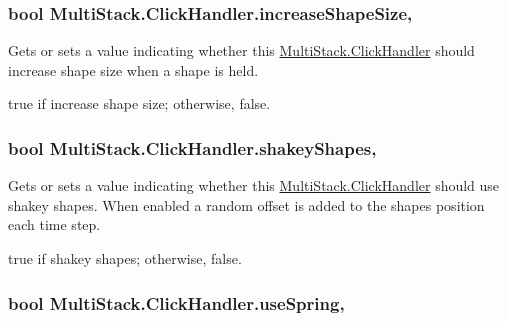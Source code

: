 \subsubsection[{increase\+Shape\+Size}]{\setlength{\rightskip}{0pt plus 5cm}bool Multi\+Stack.\+Click\+Handler.\+increase\+Shape\+Size\hspace{0.3cm}{\ttfamily [get]}, {\ttfamily [set]}}\label{class_multi_stack_1_1_click_handler_a7097c4cddc7a31d0a9d303c5367d10be}


Gets or sets a value indicating whether this \hyperlink{class_multi_stack_1_1_click_handler}{Multi\+Stack.\+Click\+Handler} should increase shape size when a shape is held. 

{\ttfamily true} if increase shape size; otherwise, {\ttfamily false}.\hypertarget{class_multi_stack_1_1_click_handler_a9088a8092cd9c9525c7024a3e7070c77}{}
\subsubsection[{shakey\+Shapes}]{\setlength{\rightskip}{0pt plus 5cm}bool Multi\+Stack.\+Click\+Handler.\+shakey\+Shapes\hspace{0.3cm}{\ttfamily [get]}, {\ttfamily [set]}}\label{class_multi_stack_1_1_click_handler_a9088a8092cd9c9525c7024a3e7070c77}


Gets or sets a value indicating whether this \hyperlink{class_multi_stack_1_1_click_handler}{Multi\+Stack.\+Click\+Handler} should use shakey shapes. When enabled a random offset is added to the shapes position each time step. 

{\ttfamily true} if shakey shapes; otherwise, {\ttfamily false}.\hypertarget{class_multi_stack_1_1_click_handler_ae1edbbbc7bc6fb0d73aac34fd5a47b48}{}
\subsubsection[{use\+Spring}]{\setlength{\rightskip}{0pt plus 5cm}bool Multi\+Stack.\+Click\+Handler.\+use\+Spring\hspace{0.3cm}{\ttfamily [get]}, {\ttfamily [set]}}\label{class_multi_stack_1_1_click_handler_ae1edbbbc7bc6fb0d73aac34fd5a47b48}


